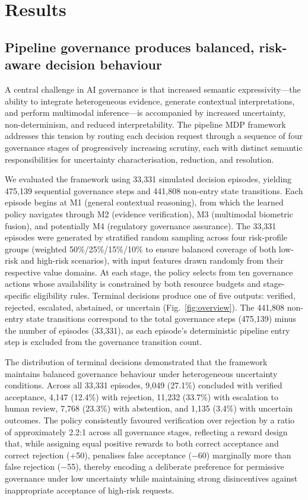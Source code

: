 \documentclass{article}
\begin{document}
\section{Results}

\subsection{Pipeline governance produces balanced, risk-aware decision behaviour}

A central challenge in AI governance is that increased semantic expressivity—the ability to integrate heterogeneous evidence, generate contextual interpretations, and perform multimodal inference—is accompanied by increased uncertainty, non-determinism, and reduced interpretability. The pipeline MDP framework addresses this tension by routing each decision request through a sequence of four governance stages of progressively increasing scrutiny, each with distinct semantic responsibilities for uncertainty characterisation, reduction, and resolution.

We evaluated the framework using 33,331 simulated decision episodes, yielding 475,139 sequential governance steps and 441,808 non-entry state transitions. Each episode begins at M1 (general contextual reasoning), from which the learned policy navigates through M2 (evidence verification), M3 (multimodal biometric fusion), and potentially M4 (regulatory governance assurance). The 33,331 episodes were generated by stratified random sampling across four risk-profile groups (weighted 50\%/25\%/15\%/10\% to ensure balanced coverage of both low-risk and high-risk scenarios), with input features drawn randomly from their respective value domains. At each stage, the policy selects from ten governance actions whose availability is constrained by both resource budgets and stage-specific eligibility rules. Terminal decisions produce one of five outputs: verified, rejected, escalated, abstained, or uncertain (Fig.~\ref{fig:overview}). The 441,808 non-entry state transitions correspond to the total governance steps (475,139) minus the number of episodes (33,331), as each episode's deterministic pipeline entry step is excluded from the governance transition count.

The distribution of terminal decisions demonstrated that the framework maintains balanced governance behaviour under heterogeneous uncertainty conditions. Across all 33,331 episodes, 9,049 (27.1\%) concluded with verified acceptance, 4,147 (12.4\%) with rejection, 11,232 (33.7\%) with escalation to human review, 7,768 (23.3\%) with abstention, and 1,135 (3.4\%) with uncertain outcomes. The policy consistently favoured verification over rejection by a ratio of approximately 2.2:1 across all governance stages, reflecting a reward design that, while assigning equal positive rewards to both correct acceptance and correct rejection (+50), penalises false acceptance ($-$60) marginally more than false rejection ($-$55), thereby encoding a deliberate preference for permissive governance under low uncertainty while maintaining strong disincentives against inappropriate acceptance of high-risk requests.
\end{document}
